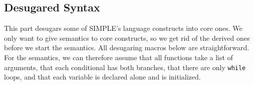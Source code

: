 \documentclass{article}
\begin{document}
\begin{kdefinition}
\begin{module}{}
\begin{syntaxBlock}{}
\end{syntaxBlock}
\begin{kblock}[text]
 \section{Desugared Syntax}
This part desugars some of SIMPLE's language constructs into core ones.
We only want to give semantics to core constructs, so we get rid of the
derived ones before we start the semantics.  All desugaring macros below are
straightforward.  For the semantics, we can therefore assume that all
functions take a list of arguments, that each conditional has both branches,
that there are only \texttt{while} loops, and that each variable is
declared alone and is initialized. \end{kblock}

\begin{syntaxBlock}{}
\end{syntaxBlock}
\end{module}
\begin{module}{}
\begin{kblock}[text]

\end{kblock}
\end{module}
\end{kdefinition}
\end{document}
